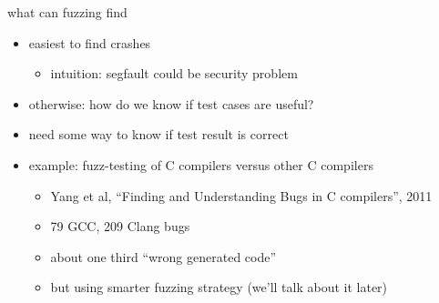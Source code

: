 \begin{frame}{what can fuzzing find}
    \begin{itemize}
        \item easiest to find crashes
            \begin{itemize}
            \item intuition: segfault could be security problem
            \end{itemize}
        \item otherwise: how do we know if test cases are useful?
        \vspace{.5cm}
        \item need some way to know if test result is correct
        \item example: fuzz-testing of C compilers versus other C compilers
            \begin{itemize}
            \item Yang et al, ``Finding and Understanding Bugs in C compilers'', 2011
            \item 79 GCC, 209 Clang bugs
            \item about one third ``wrong generated code''
            \item but using smarter fuzzing strategy (we'll talk about it later)
            \end{itemize}
    \end{itemize}
\end{frame}


